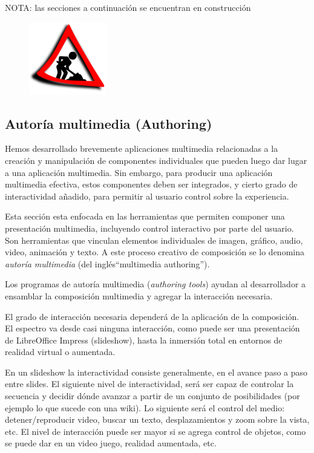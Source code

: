 \documentclass[12pt]{article}
\begin{document}
\textcolor[rgb]{1,0,0}{NOTA: las secciones a continuación se encuentran en 
construcción}

\begin{figure}[h]
\centering
\includegraphics{UN_CONSTRUCTION_2ss.png}
\renewcommand{\figurename}{Fig.}
\label{contexto:figura}
\end{figure}

\subsection*{Autoría multimedia (Authoring)}

Hemos desarrollado brevemente aplicaciones multimedia relacionadas a la 
creación y manipulación de componentes individuales que pueden luego 
dar lugar a una aplicación multimedia. Sin embargo, para producir 
una aplicación multimedia efectiva, estos componentes deben ser 
integrados, y cierto grado de interactividad añadido, para permitir
al usuario control sobre la experiencia. 

Esta sección esta enfocada en las herramientas que permiten componer una 
presentación multimedia, incluyendo 
control interactivo por parte del usuario. Son herramientas que vinculan 
elementos individuales de imagen, gráfico, audio, video, animación y texto. 
A este proceso creativo de composición se lo denomina {\it autoría multimedia} 
(del inglés``multimedia authoring''). 

Los programas de autoría multimedia ({\it authoring tools}) ayudan al desarrollador
a ensamblar la composición multimedia y agregar la interacción necesaria. 

El grado de interacción necesaria dependerá de la aplicación de la 
composición. El espectro va desde casi ninguna interacción, como puede 
ser una presentación de LibreOffice Impress (slideshow), hasta la inmersión 
total en entornos de realidad virtual o aumentada. 

En un slideshow la interactividad consiste generalmente, en el avance 
paso a paso entre slides. El siguiente nivel de interactividad, será ser
capaz de controlar la secuencia y decidir dónde avanzar a partir de 
un conjunto de posibilidades (por ejemplo lo que sucede con una wiki). 
Lo siguiente será el control del medio: detener/reproducir video, 
buscar un texto, desplazamientos y zoom sobre la vista, etc.  
El nivel de interacción puede ser mayor si se agrega control de objetos, 
como se puede dar en un video juego, realidad aumentada, etc. 
\end{document}
